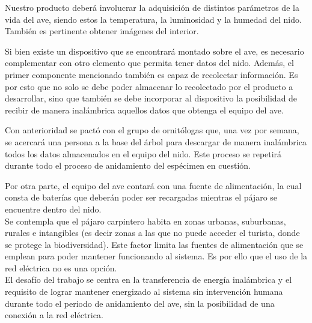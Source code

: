 



Nuestro producto deberá involucrar la adquisición de distintos parámetros de la vida del ave, siendo estos la temperatura, la luminosidad y la humedad del nido. También es pertinente obtener imágenes del interior. 

Si bien existe un dispositivo que se encontrará montado sobre el ave, es necesario complementar con otro elemento que permita tener datos del nido. Además, el primer componente mencionado también es capaz de recolectar información. Es por esto que no solo se debe poder almacenar lo recolectado por el producto a desarrollar, sino que también se debe incorporar al dispositivo la posibilidad de recibir de manera inalámbrica aquellos datos que obtenga el equipo del ave. 

Con anterioridad se pactó con el grupo de ornitólogas que, una vez por semana, se acercará una persona a la base del árbol para descargar de manera inalámbrica todos los datos almacenados en el equipo del nido. Este proceso se repetirá durante todo el proceso de anidamiento del espécimen en cuestión.

Por otra parte, el equipo del ave contará con una fuente de alimentación, la cual consta de baterías que deberán poder ser recargadas mientras el pájaro se encuentre dentro del nido.\\

Se contempla que el pájaro carpintero habita en zonas urbanas, suburbanas, rurales e intangibles (es decir zonas a las que no puede acceder el turista, donde se protege la biodiversidad). Este factor limita las fuentes de alimentación que se emplean para poder mantener funcionando al sistema. Es por ello que el uso de la red eléctrica no es una opción.\\

El desafío del trabajo se centra en la  transferencia de energía inalámbrica y el requisito de lograr mantener energizado al sistema sin intervención humana durante todo el periodo de anidamiento del ave, sin la posibilidad de una conexión a la red eléctrica.
